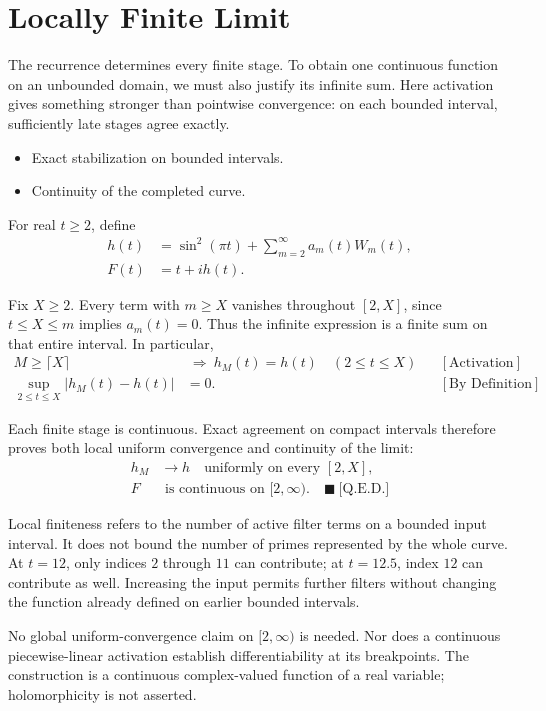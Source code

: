 \section{Locally Finite Limit}
The recurrence determines every finite stage. To obtain one continuous
function on an unbounded domain, we must also justify its infinite sum.
Here activation gives something stronger than pointwise convergence: on
each bounded interval, sufficiently late stages agree exactly.

\begin{itemize}
\item Exact stabilization on bounded intervals.
\item Continuity of the completed curve.
\end{itemize}

For real $t\ge2$, define
\begin{equation*}
\begin{aligned}
h(t)&=\sin^2(\pi t)+\sum_{m=2}^{\infty}a_m(t)W_m(t),\\
F(t)&=t+i h(t).
\end{aligned}
\end{equation*}

Fix $X\ge2$. Every term with $m\ge X$ vanishes throughout $[2,X]$, since
$t\le X\le m$ implies $a_m(t)=0$. Thus the infinite expression is a finite
sum on that entire interval. In particular,
\begin{equation*}
\begin{aligned}
M\ge\lceil X\rceil
&\ \Longrightarrow\ h_M(t)=h(t)\quad(2\le t\le X)
&&[\text{Activation}]\\
\sup_{2\le t\le X}|h_M(t)-h(t)|&=0.
&&[\text{By Definition}]
\end{aligned}
\end{equation*}

Each finite stage is continuous. Exact agreement on compact intervals
therefore proves both local uniform convergence and continuity of the limit:
\begin{equation*}
\begin{aligned}
h_M&\longrightarrow h\quad\text{uniformly on every }[2,X],\\
F&\text{ is continuous on }[2,\infty).
\quad\blacksquare\ \text{[Q.E.D.]}
\end{aligned}
\end{equation*}

Local finiteness refers to the number of active filter terms on a bounded
input interval. It does not bound the number of primes represented by the
whole curve. At $t=12$, only indices $2$ through $11$ can contribute; at
$t=12.5$, index $12$ can contribute as well. Increasing the input permits
further filters without changing the function already defined on earlier
bounded intervals.

No global uniform-convergence claim on $[2,\infty)$ is needed. Nor does a
continuous piecewise-linear activation establish differentiability at its
breakpoints. The construction is a continuous complex-valued function of a
real variable; holomorphicity is not asserted.
